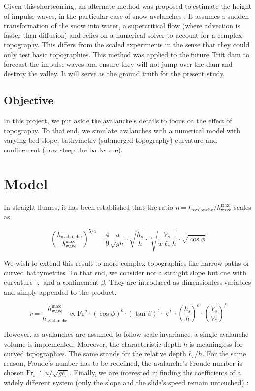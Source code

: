 \documentclass[a4paper,11pt]{article}
\begin{document}
Given this shortcoming, an alternate method was proposed to estimate the
height of impulse waves, in the particular case of snow avalanches
\citep{giboul}. It assumes a sudden transformation of the snow into
water, a supercritical flow (where advection is faster than diffusion)
and relies on a numerical solver to account for a complex topography.
This differs from the scaled experiments in the sense that they could
only test basic topographies. This method was applied to the future
Trift dam \citep{manso, giboul} to forecast the impulse waves and ensure
they will not jump over the dam and destroy the valley. It will serve as
the ground truth for the present study.

\hypertarget{objective}{%
\subsection{Objective}\label{objective}}

In this project, we put aside the avalanche's details to focus on the
effect of topography. To that end, we simulate avalanches with a
numerical model with varying bed slope, bathymetry (submerged
topography) curvature and confinement (how steep the banks are).

\hypertarget{model}{%
\section{Model}\label{model}}

In straight flumes, it has been established that the ratio
\(\eta = h_\mathrm{avalanche}/h_\mathrm{wave}^\mathrm{max}\) scales as

\[
\left(\frac{h_\mathrm{avalanche}}{h_\mathrm{wave}^\mathrm{max}}\right)^{5/4} = \frac{4}{9}\frac{u}{\sqrt{g h}}\cdot\sqrt{\frac{h_s}{h}}\cdot\sqrt[4]{\frac{V_s}{w \ell_s h}}\cdot\sqrt{\cos \phi}
\tag{1}
\]

We wish to extend this result to more complex topographies like narrow
paths or curved bathymetries. To that end, we consider not a straight
slope but one with curvature \(\varsigma\) and a confinement \(\beta\).
They are introduced as dimensionless variables and simply appended to
the product.

\[
\eta = \frac{h_\mathrm{wave}^\mathrm{max}}{h_\mathrm{avalanche}} \propto \mathrm{Fr}^a \cdot \left(\cos\phi\right)^b \cdot \left(\tan{\beta}\right)^c \cdot \varsigma^d \cdot \left(\frac{h_s}{h}\right)^e \cdot \left(\frac{V_s}{V_\ast}\right)^f
\]

However, as avalanches are assumed to follow scale-invariance, a single
avalanche volume is implemented. Moreover, the characteristic depth
\(h\) is meaningless for curved topographies. The same stands for the
relative depth \(h_s/h\). For the same reason, Froude's number has to be
redefined, the avalanche's Froude number is chosen
\(\mathrm{Fr}_s \doteq u / \sqrt{gh_s}\). Finally, we are interested in
finding the coefficients of a widely different system (only the slope
and the slide's speed remain untouched) :
\end{document}
